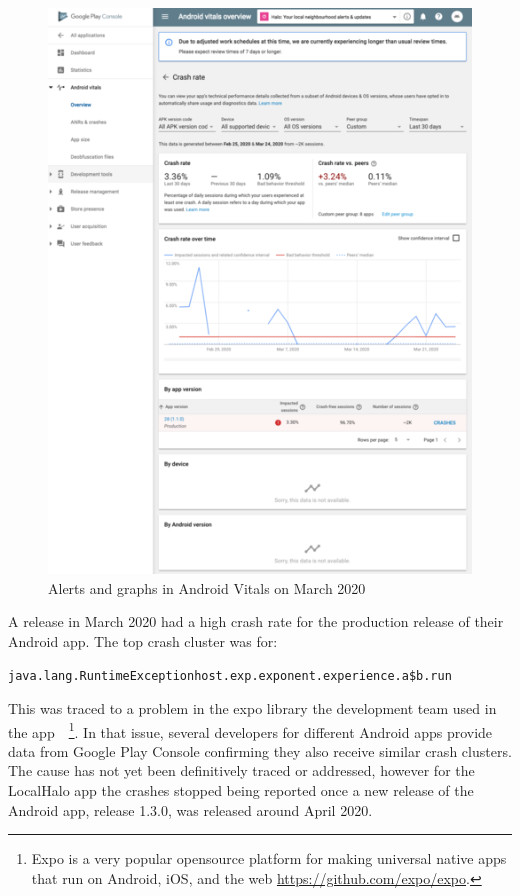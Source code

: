 \begin{figure}[htbp!]
\begin{minipage}{.45\textwidth}
\end{minipage}\hfill%
\begin{minipage}{.45\textwidth}
  \centering
  \includegraphics[width=\textwidth]{images/localhalo/apphealthdetailsplace_55505963_high_errors.png}
\end{minipage}
    \caption{Alerts and graphs in Android Vitals on  March 2020}
    \label{fig:localhalo-android-vitals-high-failures-26-march-2020}
\end{figure}

A release in March 2020 had a high crash rate for the production release of their Android app. The top crash cluster was for:

{\small \texttt{java.lang.RuntimeExceptionhost.exp.exponent.experience.a\$b.run}} 

This was traced to a problem in the expo library the development team used in the app~\citep{expo2019_issue5839}~\footnote{Expo is a very popular opensource platform for making universal native apps that run on Android, iOS, and the web \url{https://github.com/expo/expo}.}. In that issue, several developers for different Android apps provide data from Google Play Console confirming they also receive similar crash clusters. The cause has not yet been definitively traced or addressed, however for the LocalHalo app the crashes stopped being reported once a new release of the Android app, release 1.3.0, was released around  April 2020.


